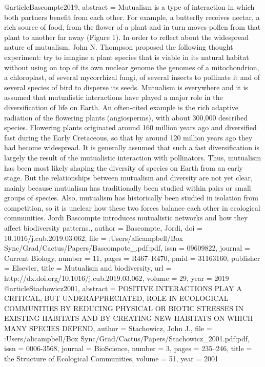 @article{Bascompte2019,
abstract = {Mutualism is a type of interaction in which both partners benefit from each other. For example, a butterfly receives nectar, a rich source of food, from the flower of a plant and in turn moves pollen from that plant to another far away (Figure 1). In order to reflect about the widespread nature of mutualism, John N. Thompson proposed the following thought experiment: try to imagine a plant species that is viable in its natural habitat without using on top of its own nuclear genome the genomes of a mitochondrion, a chloroplast, of several mycorrhizal fungi, of several insects to pollinate it and of several species of bird to disperse its seeds. Mutualism is everywhere and it is assumed that mutualistic interactions have played a major role in the diversification of life on Earth. An often-cited example is the rich adaptive radiation of the flowering plants (angiosperms), with about 300,000 described species. Flowering plants originated around 160 million years ago and diversified fast during the Early Cretaceous, so that by around 120 million years ago they had become widespread. It is generally assumed that such a fast diversification is largely the result of the mutualistic interaction with pollinators. Thus, mutualism has been most likely shaping the diversity of species on Earth from an early stage. But the relationships between mutualism and diversity are not yet clear, mainly because mutualism has traditionally been studied within pairs or small groups of species. Also, mutualism has historically been studied in isolation from competition, so it is unclear how these two forces balance each other in ecological communities. Jordi Bascompte introduces mutualistic networks and how they affect biodiversity patterns.},
author = {Bascompte, Jordi},
doi = {10.1016/j.cub.2019.03.062},
file = {:Users/alicampbell/Box Sync/Grad/Cactus/Papers/Bascompote_.pdf:pdf},
issn = {09609822},
journal = {Current Biology},
number = {11},
pages = {R467--R470},
pmid = {31163160},
publisher = {Elsevier},
title = {{Mutualism and biodiversity}},
url = {http://dx.doi.org/10.1016/j.cub.2019.03.062},
volume = {29},
year = {2019}
}
@article{Stachowicz2001,
abstract = {POSITIVE INTERACTIONS PLAY A CRITICAL, BUT UNDERAPPRECIATED, ROLE IN ECOLOGICAL COMMUNITIES BY REDUCING PHYSICAL OR BIOTIC STRESSES IN EXISTING HABITATS AND BY CREATING NEW HABITATS ON WHICH MANY SPECIES DEPEND},
author = {Stachowicz, John J.},
file = {:Users/alicampbell/Box Sync/Grad/Cactus/Papers/Stachowicz_2001.pdf:pdf},
issn = {0006-3568},
journal = {BioScience},
number = {3},
pages = {235--246},
title = {{the Structure of Ecological Communities}},
volume = {51},
year = {2001}
}
